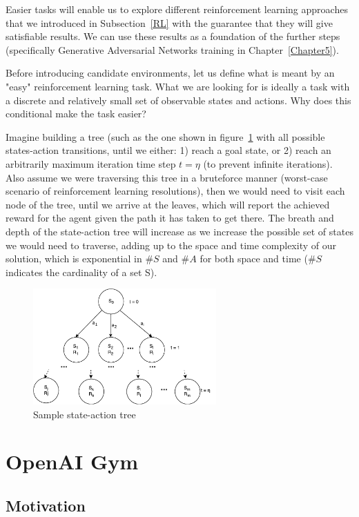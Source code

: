 Easier tasks will enable us to explore different reinforcement learning approaches that we introduced in Subsection~\ref{RL} with the guarantee that they will give satisfiable results. We can use these results as a foundation of the further steps (specifically Generative Adversarial Networks training in Chapter~\ref{Chapter5}).

Before introducing candidate environments, let us define what is meant by an "easy" reinforcement learning task. What we are looking for is ideally a task with a discrete and relatively small set of observable states and actions. Why does this conditional make the task easier?

Imagine building a tree (such as the one shown in figure~\ref{fig:RLTree} with all possible states-action transitions, until we either: 1) reach a goal state, or 2) reach an arbitrarily maximum iteration time step $t = \eta$ (to prevent infinite iterations). Also assume we were traversing this tree in a bruteforce manner (worst-case scenario of reinforcement learning resolutions), then we would need to visit each node of the tree, until we arrive at the leaves, which will report the achieved reward for the agent given the path it has taken to get there.
The breath and depth of the state-action tree will increase as we increase the possible set of states we would need to traverse, adding up to the space and time complexity of our solution, which is exponential in $\#S$ and $\#A$ for both space and time ($\#S$ indicates the cardinality of a set S).

\begin{figure}
\centering
\includegraphics[width=7cm]{Figures/RLTree}
\caption{Sample state-action tree}
\label{fig:RLTree}
\end{figure}

\section{OpenAI Gym}
\subsection{Motivation}
